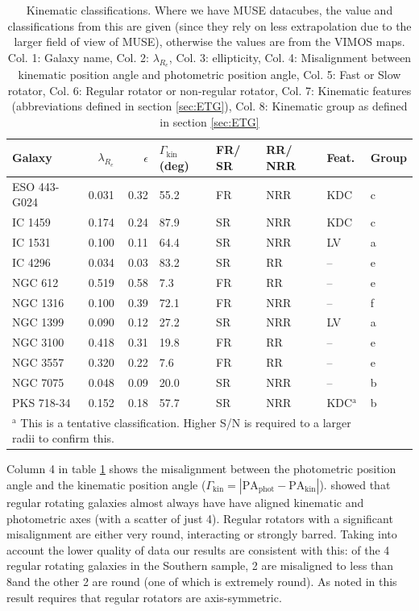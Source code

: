 		\begin{table}
			\centering
			\caption{Kinematic classifications. Where we have MUSE datacubes, the value and classifications from this are given (since they rely on less extrapolation due to the larger field of view of MUSE), otherwise the values are from the VIMOS maps. Col. 1: Galaxy name, Col. 2: $\lambda_{R_e}$, Col. 3: ellipticity, Col. 4: Misalignment between kinematic position angle and photometric position angle, Col. 5: Fast or Slow rotator, Col. 6: Regular rotator or non-regular rotator, Col. 7: Kinematic features (abbreviations defined in section \ref{sec:ETG}), Col. 8: Kinematic group as defined in section \ref{sec:ETG}}
			\label{tab:classify}
			\begin{tabular}{l r r p{0.7cm} l l l l}
				\hline
				\hline
				Galaxy		& $\lambda_{R_e}$ & $\epsilon$  & $\Gamma_\text{kin}$ (deg) & FR/ SR 	& RR/ NRR 	& Feat. & Group 	\\
				\hline 
				ESO 443-G024 & 0.031 & 0.32 & 55.2 	& FR & NRR & KDC & c \\
				IC 1459 	& 0.174 & 0.24 & 87.9	& SR & NRR & KDC & c \\
				IC 1531 	& 0.100 & 0.11 & 64.4 	& SR & NRR & LV & a \\
				IC 4296		& 0.034 & 0.03 & 83.2 	& SR & RR & -- & e \\
				NGC 612 	& 0.519 & 0.58 & 7.3 	& FR & RR & -- & e \\
				NGC 1316 	& 0.100 & 0.39 & 72.1 	& FR & NRR & -- & f \\
				NGC 1399 	& 0.090 & 0.12 & 27.2 	& SR & NRR & LV & a \\
				NGC 3100 	& 0.418 & 0.31 & 19.8 	& FR & RR & -- & e \\
				NGC 3557 	& 0.320 & 0.22 & 7.6 	& FR & RR & -- & e\\
				NGC 7075 	& 0.048 & 0.09 & 20.0 	& SR & NRR & -- & b \\
				PKS 718-34  & 0.152 & 0.18 & 57.7 	& SR & NRR & KDC$^\text{a}$ & b\\
				\hline
				\hline
				\multicolumn{7}{L{.9\textwidth}}{\footnotesize $^\text{a}$ This is a tentative classification. Higher S/N is required to a larger radii to confirm this.} \\ %
			\end{tabular}
		\end{table}

		Column 4 in table \ref{tab:classify} shows the misalignment between the photometric position angle and the kinematic position angle ($\Gamma_\text{kin} = \left| \mathrm{PA_{phot}} - \mathrm{PA_{kin}} \right|$). \citet{Cappellari2007, Krajnovic2011, Fogarty2015} showed that regular rotating galaxies almost always have have aligned kinematic and photometric axes (with a scatter of just 4\degree). Regular rotators with a significant misalignment are either very round, interacting or strongly barred. Taking into account the lower quality of data our results are consistent with this: of the 4 regular rotating galaxies in the Southern sample, 2 are misaligned to less than 8\degree and the other 2 are round (one of which is extremely round). As noted in \citet{Cappellari2016} this result requires that regular rotators are axis-symmetric. 

